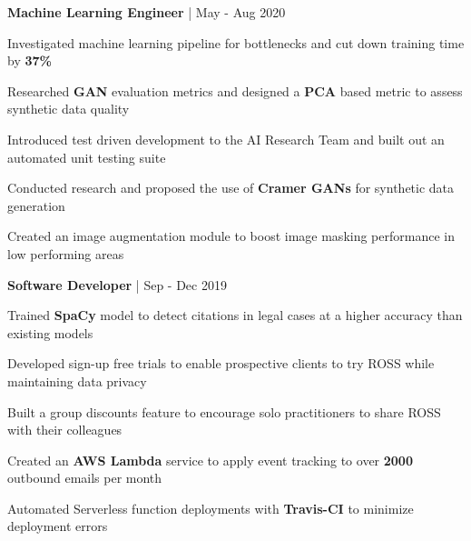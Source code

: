 


\begin{cventries}


\cventry
{\textbf{Machine Learning Engineer} | \color{awesome}{PerkinElmer}}
{May - Aug 2020} %
{ %
\begin{cvitems}
\item {Investigated machine learning pipeline for bottlenecks and cut down training time by \textbf{37\%}}
\item {Researched \textbf{GAN} evaluation metrics and designed a \textbf{PCA} based metric to assess synthetic data quality}
\item {Introduced test driven development to the AI Research Team and built out an automated unit testing suite}
\item {Conducted research and proposed the use of \textbf{Cramer GANs} for synthetic data generation}
\item {Created an image augmentation module to boost image masking performance in low performing areas}
\end{cvitems}
}


\cventry
{\textbf{Software Developer} | \color{awesome}{ROSS Intelligence}}
{Sep - Dec 2019} %
{ %
\begin{cvitems}
\item {Trained \textbf{SpaCy} model to detect citations in legal cases at a higher accuracy than existing models}
\item {Developed sign-up free trials to enable prospective clients to try ROSS while maintaining data privacy}
\item {Built a group discounts feature to encourage solo practitioners to share ROSS with their colleagues}
\item {Created an \textbf{AWS Lambda} service to apply event tracking to over \textbf{2000} outbound emails per month}
\item {Automated Serverless function deployments with \textbf{Travis-CI} to minimize deployment errors}
\end{cvitems}
}


\end{cventries}
